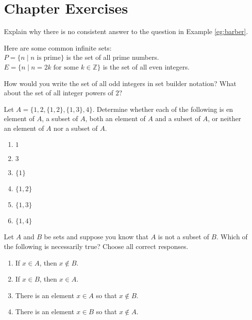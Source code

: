 \clearpage

\section*{Chapter  Exercises}
\anschapter

\begin{exercise}
Explain why there is no consistent answer to the question in Example
\ref{eg:barber}.
\end{exercise}

\begin{exercise}
Here are some common infinite sets:\\
$P=\{ n\mid n \textrm{ is prime}\}$ is the set of all prime numbers.\\
$E=\{ n\mid n=2k \textrm{ for some } k\in{\mathbb Z}\}$ is the set of
all even integers.

How would you write the set of all odd integers in set builder notation?
What about the set of all integer powers of $2$? 
\end{exercise}

\begin{exercise}\label{exer:subsets}
Let $A=\bigl\{ 1,2,\{1,2\},\{1,3\},4 \bigr\} $. Determine whether each of the following is en element of $A$, a subset of $A$, both an element of $A$ and a subset of $A$, or neither an element of $A$ nor a subset of $A$.
\begin{enumerate}
\item $1$
\item\label{subsets:first} \markit $3$
\item $\{1\}$
\item $\{1,2\}$
\item $\{1,3\}$
\item\label{subsets:second}\markit $\{1,4\}$
\end{enumerate}
\end{exercise}

\begin{exercise}
Let $A$ and $B$ be sets and suppose you know that $A$ is not a subset of $B$. Which of the following is necessarily true? Choose all correct responses.
\begin{enumerate}
\item If $x\in A$, then $x\notin B$.
\item If $x\in B$, then $x\in A$.
\item There is an element $x\in A$ so that $x\notin B$.
\item There is an element $x\in B$ so that $x\notin A$.
\end{enumerate}
\end{exercise}

